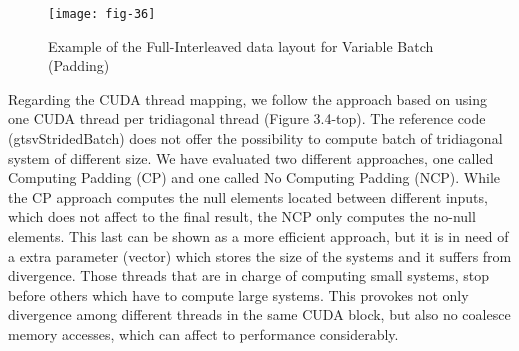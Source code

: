     \vspace{1ex}
    \begin{figure}[htbp]
        \centering
        \texttt{[image: fig-36]}
        \caption{Example of the Full-Interleaved data layout for Variable Batch (Padding)}
        \label{fig:fig-36}
    \end{figure}

Regarding the CUDA thread mapping, we follow the approach based on using one
CUDA thread per tridiagonal thread (Figure 3.4-top). The reference code (gtsvStridedBatch) does not offer the possibility to compute batch of tridiagonal system of different
size. We have evaluated two different approaches, one called Computing Padding (CP)
and one called No Computing Padding (NCP). While the CP approach computes the
null elements located between different inputs, which does not affect to the final result,
the NCP only computes the no-null elements. This last can be shown as a more efficient
approach, but it is in need of a extra parameter (vector) which stores the size of the
systems and it suffers from divergence. Those threads that are in charge of computing
small systems, stop before others which have to compute large systems. This provokes
not only divergence among different threads in the same CUDA block, 
but also no coalesce memory accesses, which can affect to performance
considerably. 


